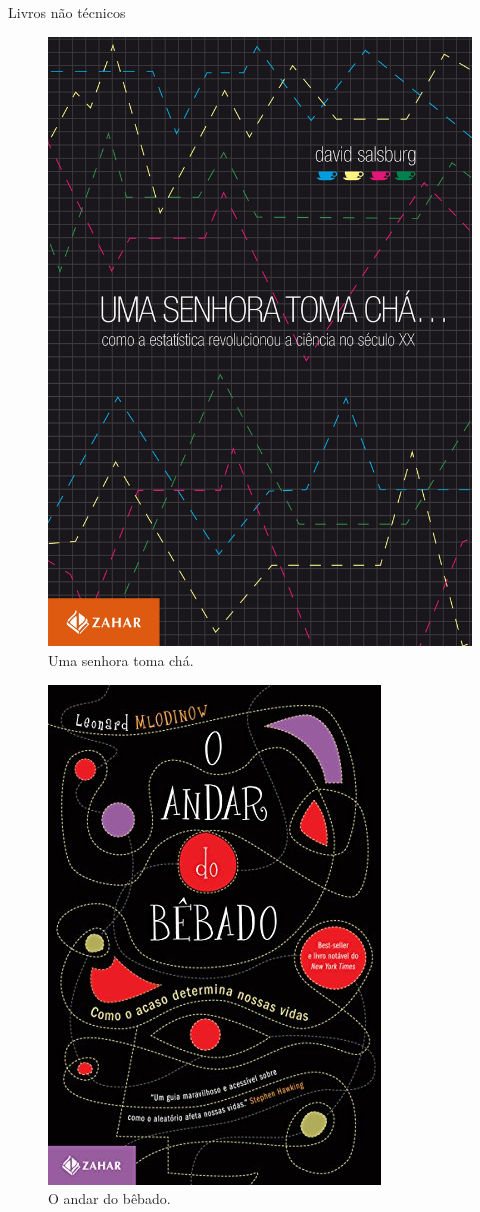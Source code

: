 \documentclass[
  ignorenonframetext,
  serif,
  professionalfont,
  usenames,
  dvipsnames,
  aspectratio = 169]{beamer}
\def\beginAHalfColumn{\begin{minipage}{0.49\textwidth}}%
\def\endColumns{\end{minipage}}%
\begin{document}
\begin{frame}{Livros não técnicos}
\label{livros-nuxe3o-tuxe9cnicos}
\beginAHalfColumn

\begin{figure}

{\centering \includegraphics[width=0.5\linewidth]{./img/cha} 

}

\caption{Uma senhora toma chá.}\label{fig:unnamed-chunk-15}
\end{figure}

\endColumns
\beginAHalfColumn

\begin{figure}

{\centering \includegraphics[width=0.5\linewidth]{./img/bebado} 

}

\caption{O andar do bêbado.}\label{fig:unnamed-chunk-16}
\end{figure}

\endColumns
\end{frame}
\end{document}
